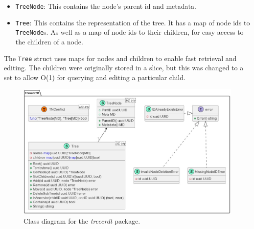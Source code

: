 \documentclass[12pt]{report}
\begin{document}
\begin{itemize}
    \item \texttt{TreeNode}: This contains the node's parent id and metadata.
    \item \texttt{Tree}: This contains the representation of the tree. It has a map of node ids to \texttt{TreeNode}s. As well as a map of node ids to their children, for easy access to the children of a node.
\end{itemize}

The \texttt{Tree} struct uses maps for nodes and children to enable fast retrieval and editing. The children were originally stored in a slice, but this was changed to a set to allow O(1) for querying and editing a particular child. 

\begin{figure}[H]
    \centering
    \includegraphics[width=1\textwidth{}]{images/treecrdt_impl.jpg} 
    \caption{Class diagram for the \textit{treecrdt} package.}
    \label{fig:treecrdt_impl} 
\end{figure} 
\end{document}
